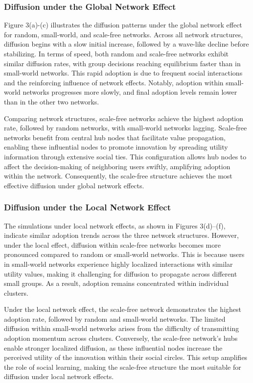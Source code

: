 \documentclass{article} %
\begin{document}
\subsubsection{Diffusion under the Global Network Effect}

Figure 3(a)-(c) illustrates the diffusion patterns under the global network effect for random, small-world, and scale-free networks. Across all network structures, diffusion begins with a slow initial increase, followed by a wave-like decline before stabilizing. In terms of speed, both random and scale-free networks exhibit similar diffusion rates, with group decisions reaching equilibrium faster than in small-world networks. This rapid adoption is due to frequent social interactions and the reinforcing influence of network effects. Notably, adoption within small-world networks progresses more slowly, and final adoption levels remain lower than in the other two networks.

Comparing network structures, scale-free networks achieve the highest adoption rate, followed by random networks, with small-world networks lagging. Scale-free networks benefit from central hub nodes that facilitate value propagation, enabling these influential nodes to promote innovation by spreading utility information through extensive social ties. This configuration allows hub nodes to affect the decision-making of neighboring users swiftly, amplifying adoption within the network. Consequently, the scale-free structure achieves the most effective diffusion under global network effects.

\subsubsection{Diffusion under the Local Network Effect}

The simulations under local network effects, as shown in Figures 3(d)–(f), indicate similar adoption trends across the three network structures. However, under the local effect, diffusion within scale-free networks becomes more pronounced compared to random or small-world networks. This is because users in small-world networks experience highly localized interactions with similar utility values, making it challenging for diffusion to propagate across different small groups. As a result, adoption remains concentrated within individual clusters.

Under the local network effect, the scale-free network demonstrates the highest adoption rate, followed by random and small-world networks. The limited diffusion within small-world networks arises from the difficulty of transmitting adoption momentum across clusters. Conversely, the scale-free network’s hubs enable stronger localized diffusion, as these influential nodes increase the perceived utility of the innovation within their social circles. This setup amplifies the role of social learning, making the scale-free structure the most suitable for diffusion under local network effects.
\end{document}
